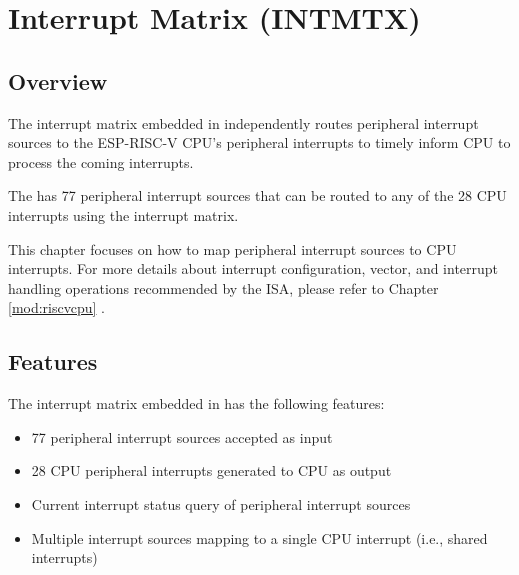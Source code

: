 \documentclass[main\_\_EN.tex]{subfiles}
\begin{document}

\ifglobal
\else
    {\let\clearpage\relax \listoftodos}
    {\let\clearpage\relax \listofdonetodos}
    \tableofcontents
\fi



\hypertarget{intmtrx}{}
\chapter{Interrupt Matrix (INTMTX)}
\label{mod:intmtrx}


\section{Overview}

The interrupt matrix embedded in \chipname{} independently routes peripheral interrupt sources to the ESP-RISC-V CPU's peripheral interrupts to timely inform CPU to process the coming interrupts. 

The \chipname{} has 77 peripheral interrupt sources that can be routed to any of the 28 CPU interrupts using the interrupt matrix.

\begin{tiplisting}
This chapter focuses on how to map peripheral interrupt sources to CPU interrupts. For more details about interrupt configuration, vector, and interrupt handling operations recommended by the ISA, please refer to Chapter \ref{mod:riscvcpu} \textit{}.
\end{tiplisting}
\vspace{-1em}


\section{Features}

The interrupt matrix embedded in \chipname{} has the following features:

\begin{itemize}
    \item 77 peripheral interrupt sources accepted as input
    \item 28 CPU peripheral interrupts generated to CPU as output
    \item Current interrupt status query of peripheral interrupt sources
    \item Multiple interrupt sources mapping to a single CPU interrupt (i.e., shared interrupts)
\end{itemize}
\end{document}
